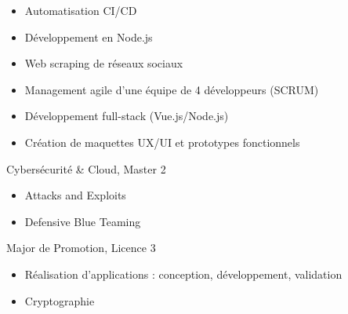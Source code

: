 \documentclass[10pt,a4paper,ragged2e,withhyper]{altacv}
\begin{document}
\begin{paracol}{2}
\divider

\begin{itemize}
    \item Automatisation CI/CD
    \item Développement en Node.js
    \item Web scraping de réseaux sociaux
\end{itemize}

\divider

\begin{itemize}
    \item Management agile d'une équipe de 4 développeurs (SCRUM)
    \item Développement full-stack (Vue.js/Node.js)
    \item Création de maquettes UX/UI et prototypes fonctionnels
\end{itemize}


\switchcolumn



\divider



{\faLock} Cybersécurité \& Cloud, Master 2\break
\begin{itemize}
    \item Attacks and Exploits
    \item Defensive Blue Teaming
\end{itemize}

\divider

{\faTrophy} Major de Promotion, Licence 3\break
\begin{itemize}
    \item Réalisation d'applications : conception, développement, validation
    \item Cryptographie
\end{itemize}


\end{paracol}
\end{document}
